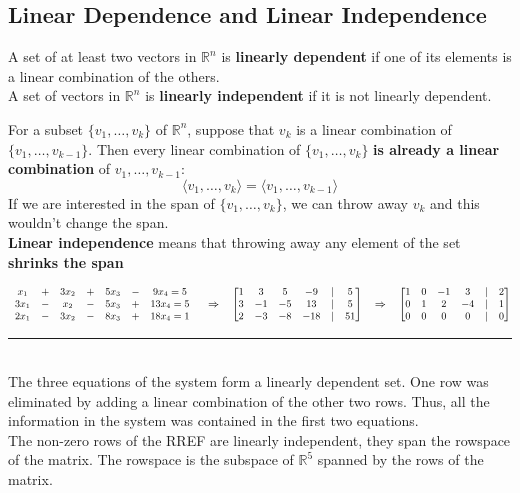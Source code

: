 \documentclass[a4paper, 9pt]{extarticle}
\begin{document}
\subsection{Linear Dependence and Linear Independence}
\begin{definitionbox}{}{}
  A set of at least two vectors in $\mathbb{R}^n$ is \textbf{linearly dependent} if one of its elements is a linear combination of the others. \\[2ex]
  A set of vectors in $\mathbb{R}^n$ is \textbf{linearly independent} if it is not linearly
  dependent.
\end{definitionbox}
\noindent For a subset $\{v_1, \dots, v_k\}$ of $\mathbb{R}^n$, suppose that $v_k$ is a linear combination of $\{v_1, \dots, v_{k-1}\}$. Then every linear combination of $\{v_1, \dots, v_k\}$ \textbf{is already a linear combination} of $v_1, \dots, v_{k-1}$:
$$\langle v_1, \dots, v_k \rangle = \langle v_1, \dots, v_{k-1} \rangle$$
If we are interested in the span of $\{v_1, \dots, v_k\}$, we can throw away $v_k$ and this wouldn't change the span. \\[2ex]
\textbf{Linear independence} means that throwing away any element of the set \textbf{shrinks the span}
\begin{examplebox}{}{}
  $$
    \small
    \begin{array}{ccccccccc}
      x_1  & + & 3x_2 & + & 5x_3 & - & 9x_4   =  5 \\
      3x_1 & - & x_2  & - & 5x_3 & + & 13x_4  =  5 \\
      2x_1 & - & 3x_2 & - & 8x_3 & + & 18x_4  =  1 \\
    \end{array}
    \quad \Rightarrow \quad
    \begin{bmatrix}
      1 & 3   & 5   & -9  & | & 5  \\
      3 & -1  & -5  & 13  & | & 5  \\
      2 & - 3 & - 8 & -18 & | & 51
    \end{bmatrix}
    \quad \Rightarrow \quad
    \begin{bmatrix}
      1 & 0 & -1 & 3  & | & 2 \\
      0 & 1 & 2  & -4 & | & 1 \\
      0 & 0 & 0  & 0  & | & 0
    \end{bmatrix}
  $$
  \rule{\textwidth}{1px} \\[2ex]
  The three equations of the system form a linearly dependent set. One row was eliminated by adding a linear combination of the other two rows. Thus, all the information in the system  was contained in the first two equations. \\[2ex]
  The non-zero rows of the RREF are linearly independent, they span the rowspace of the matrix. The rowspace is the subspace of $\mathbb{R}^5$ spanned by the rows of the matrix.
\end{examplebox}
\end{document}
